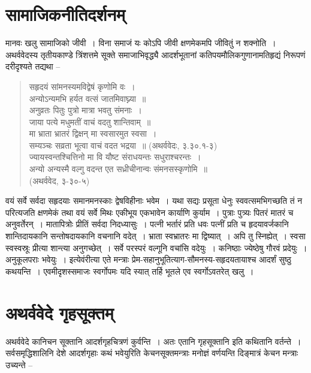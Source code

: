 {\section*{सामाजिकनीतिदर्शनम्}

मानवः खलु सामाजिको जीवी~। विना समाजं यः कोऽपि जीवी क्षणमेकमपि जीवितुं न शक्नोति~। अथर्ववेदस्य तृतीयकाण्डे त्रिंशत्तमे सूक्ते समाजाभिवृद्ध्यै आदर्शभूतानां कतिपयमौलिकगुणानामतिहृद्यं निरूपणं दरीदृश्यते तद्यथा –

\begin{verse}
{सहृदयं सांमनस्यमविद्वेषं कृणोमि वः~। }\\
{अन्योऽन्यमभि हर्यत वत्सं जातमिवाघ्न्या~॥}\\
{अनुव्रतः पितुः पुत्रो मात्रा भवतु संमनाः~। }\\
{जाया पत्ये मधुमतीं वाचं वदतु शान्तिवाम्~॥}\\
{मा भ्राता भ्रातरं द्विक्षन् मा स्वसारमुत स्वसा~। }\\
{सम्यञ्चः सव्रता भूत्वा वाचं वदत भद्रया~॥} (अथर्ववेदः, ३.३०.१-३)\\
{ज्यायस्वन्तश्चित्तिनो मा वि यौष्ट संराधयन्तः सधुराश्चरन्तः~। }\\
{अन्यो अन्यस्मै वल्गु वदन्त एत सध्रीचीनान्वः संमनसस्कृणोमि~॥}\\
\hspace{6cm}(अथर्ववेद, ३-३०-५)
\end{verse}

वयं सर्वे सर्वदा सहृदयाः समानमनस्काः द्वेषविहीनाः भवेम~। यथा सद्यः प्रसूता धेनुः स्ववत्समभिगच्छति तं न परित्यजति क्षणमेकं तथा वयं सर्वे मिथः एकीभूय एकभावेन कार्याणि कुर्याम~। पुत्राः पुत्र्यः पितरं मातरं च अनुवर्तेरन्~। मातापित्रोः प्रीतिं सर्वदा निदध्यासुः~। पत्नी भर्तारं प्रति धवः पत्नीं प्रति च हृदयावर्जकानि शान्तिदायकानि सन्तोषदायकानि वचनानि वदेत्~। भ्राता स्वभ्रातरः मा द्विष्यात्~। अपि तु स्निह्येत्~। स्वसा स्वस्वस्रूः प्रीत्या शान्त्या अनुगच्छेत्~। सर्वे परस्परं वल्गूनि वचांसि वदेयुः~। कनिष्ठाः ज्येष्ठेषु गौरवं प्रदेयुः~। अनुकूलपराः भवेयुः~। इत्येवंरीत्या एते मन्त्राः प्रेम-सहानुभूतित्याग-सौमनस्य-सहृदयतायाश्च आदर्शं सुष्ठु कथयन्ति~। एवमीदृशस्समाजः स्वर्गोपमः यदि स्यात् तर्हि भूतले एव स्वर्गोऽवतरेत् खलु~। 


\section*{अथर्ववेदे गृहसूक्तम्}

अथर्ववेदे कानिचन सूक्तानि आदर्शगृहचित्रणं कुर्वन्ति~। अतः एतानि गृहसूक्तानि इति कथितानि वर्तन्ते~। सर्वसमृद्धिशालिनि देशे आदर्शगृहाः कथं भवेयुरिति केचनसूक्तमन्त्राः मनोज्ञं वर्णयन्ति दिङ्मात्रं केचन मन्त्राः उच्यन्ते –

}
